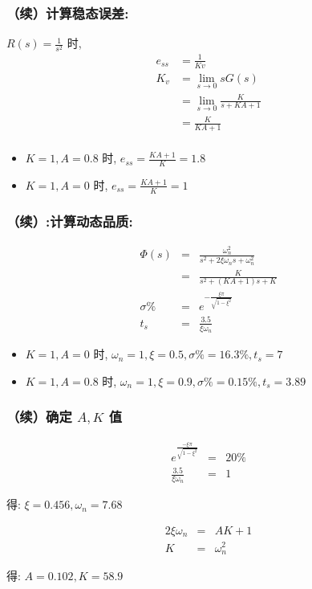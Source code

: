 \documentclass{beamer}
\begin{document}
\begin{frame}
\frametitle{（续）计算稳态误差:}
\label{sec-1-3}

 $R(s)=\frac{1}{s^2}$ 时,
\begin{align*}
e_{ss} &= \frac{1}{Kv} \\
K_v &= \lim_{s\rightarrow 0}sG(s) \\
    &= \lim_{s\rightarrow 0}\frac{K}{s+KA+1} \\
    &= \frac{K}{KA+1} \\
\end{align*}

\begin{itemize}
\item $K=1,A=0.8$ 时, $e_{ss}=\frac{KA+1}{K}=1.8$
\item $K=1,A=0$ 时, $e_{ss}=\frac{KA+1}{K}=1$
\end{itemize}
\end{frame}
\begin{frame}
\frametitle{（续）:计算动态品质:}
\label{sec-1-4}


\begin{eqnarray*}
\Phi(s) &=& \frac{\omega_n^2}{s^2+2\xi\omega_n s+\omega_n^2} \\
        &=& \frac{K}{s^2+(KA+1)s+K} \\
\sigma\% &=& e^{-\frac{\xi\pi}{\sqrt{1-\xi^2}}} \\
t_s &=& \frac{3.5}{\xi\omega_n}
\end{eqnarray*}

\begin{itemize}
\item <2-> $K=1,A=0$ 时, $\omega_n=1,\xi=0.5,\sigma\%=16.3\%,t_s=7$
\item <3-> $K=1,A=0.8$ 时, $\omega_n=1,\xi=0.9,\sigma\%=0.15\%,t_s=3.89$
\end{itemize}
\end{frame}
\begin{frame}
\frametitle{（续）确定 $A,K$ 值}
\label{sec-1-5}



\begin{eqnarray*}
e^{\frac{-\xi\pi}{\sqrt{1-\xi^2}}} &=&20\% \\
\frac{3.5}{\xi\omega_n} &=& 1
\end{eqnarray*}

得: $\xi=0.456,\omega_n=7.68$

\begin{eqnarray*}
2\xi\omega_n & = & AK+1\\
K &=& \omega_n^2
\end{eqnarray*}

得: $A=0.102,K=58.9$
\end{frame}
\end{document}
